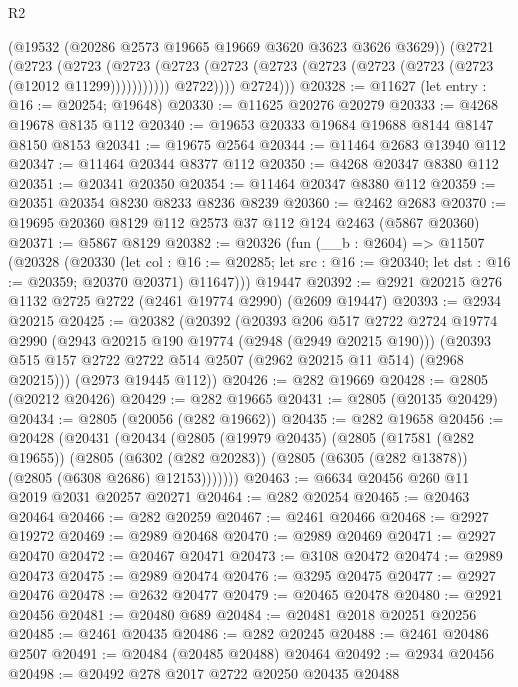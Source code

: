 \begin{lexlean}{R2}
\begin{coremodule}
                (@19532 (@20286 @2573 @19665 @19669 @3620 @3623 @3626 @3629))
                (@2721
                  (@2723
                    (@2723
                      (@2723
                        (@2723 (@2723 (@2723 (@2723 (@2723 (@2723 (@2723 (@12012 @11299)))))))))))
                  @2722))))
          @2724)))
@20328 := @11627 (let entry : @16 := @20254; @19648)
@20330 := @11625 @20276 @20279
@20333 := @4268 @19678 @8135 @112
@20340 := @19653 @20333 @19684 @19688 @8144 @8147 @8150 @8153
@20341 := @19675 @2564
@20344 := @11464 @2683 @13940 @112
@20347 := @11464 @20344 @8377 @112
@20350 := @4268 @20347 @8380 @112
@20351 := @20341 @20350
@20354 := @11464 @20347 @8380 @112
@20359 := @20351 @20354 @8230 @8233 @8236 @8239
@20360 := @2462 @2683
@20370 := @19695 @20360 @8129 @112 @2573 @37 @112 @124 @2463 (@5867 @20360)
@20371 := @5867 @8129
@20382 := @20326
    (fun (__b : @2604) =>
    @11507
      (@20328
        (@20330
          (let col : @16 := @20285; let src : @16 := @20340; let dst : @16 := @20359; @20370 @20371)
          @11647)))
    @19447
@20392 := @2921 @20215 @276 @1132 @2725 @2722 (@2461 @19774 @2990) (@2609 @19447)
@20393 := @2934 @20215
@20425 := @20382
    (@20392
      (@20393
        @206
        @517
        @2722
        @2724
        @19774
        @2990
        (@2943 @20215 @190 @19774 (@2948 (@2949 @20215 @190)))
        (@20393 @515 @157 @2722 @2722 @514 @2507 (@2962 @20215 @11 @514) (@2968 @20215)))
      (@2973 @19445 @112))
@20426 := @282 @19669
@20428 := @2805 (@20212 @20426)
@20429 := @282 @19665
@20431 := @2805 (@20135 @20429)
@20434 := @2805 (@20056 (@282 @19662))
@20435 := @282 @19658
@20456 := @20428
    (@20431
      (@20434
        (@2805
          (@19979 @20435)
          (@2805
            (@17581 (@282 @19655))
            (@2805
              (@6302 (@282 @20283))
              (@2805 (@6305 (@282 @13878)) (@2805 (@6308 @2686) @12153)))))))
@20463 := @6634 @20456 @260 @11 @2019 @2031 @20257 @20271
@20464 := @282 @20254
@20465 := @20463 @20464
@20466 := @282 @20259
@20467 := @2461 @20466
@20468 := @2927 @19272
@20469 := @2989 @20468
@20470 := @2989 @20469
@20471 := @2927 @20470
@20472 := @20467 @20471
@20473 := @3108 @20472
@20474 := @2989 @20473
@20475 := @2989 @20474
@20476 := @3295 @20475
@20477 := @2927 @20476
@20478 := @2632 @20477
@20479 := @20465 @20478
@20480 := @2921 @20456
@20481 := @20480 @689
@20484 := @20481 @2018 @20251 @20256
@20485 := @2461 @20435
@20486 := @282 @20245
@20488 := @2461 @20486 @2507
@20491 := @20484 (@20485 @20488) @20464
@20492 := @2934 @20456
@20498 := @20492 @278 @2017 @2722 @20250 @20435 @20488

\end{coremodule}
\end{lexlean}
